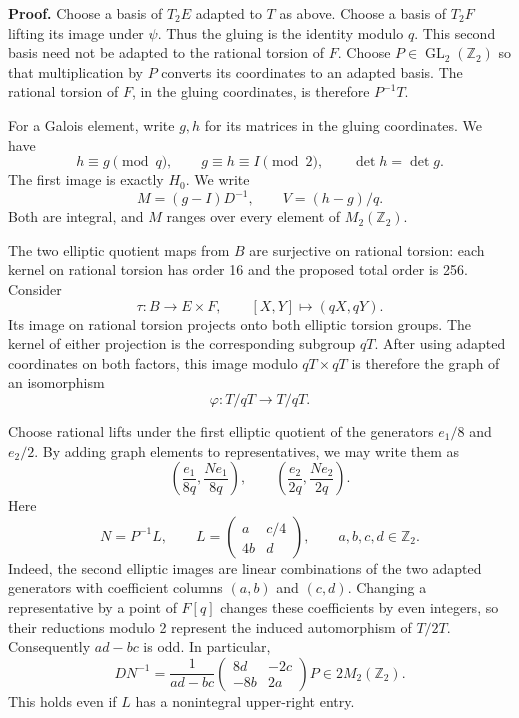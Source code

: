\documentclass[
  11pt,
]{article}
\begin{document}
\textbf{Proof.} Choose a basis of \(T_2E\) adapted to \(T\) as above.
Choose a basis of \(T_2F\) lifting its image under \(\psi\). Thus the
gluing is the identity modulo \(q\). This second basis need not be
adapted to the rational torsion of \(F\). Choose
\(P\in\operatorname{GL}_2(\mathbb Z_2)\) so that multiplication by \(P\)
converts its coordinates to an adapted basis. The rational torsion of
\(F\), in the gluing coordinates, is therefore \(P^{-1}T\).

For a Galois element, write \(g,h\) for its matrices in the gluing
coordinates. We have \[
h\equiv g\pmod q,
\qquad g\equiv h\equiv I\pmod2,
\qquad \det h=\det g.
\] The first image is exactly \(H_0\). We write \[
M=(g-I)D^{-1},\qquad V=(h-g)/q.
\] Both are integral, and \(M\) ranges over every element of
\(M_2(\mathbb Z_2)\).

The two elliptic quotient maps from \(B\) are surjective on rational
torsion: each kernel on rational torsion has order 16 and the proposed
total order is 256. Consider \[
\tau:B\longrightarrow E\times F,
\qquad [X,Y]\longmapsto(qX,qY).
\] Its image on rational torsion projects onto both elliptic torsion
groups. The kernel of either projection is the corresponding subgroup
\(qT\). After using adapted coordinates on both factors, this image
modulo \(qT\times qT\) is therefore the graph of an isomorphism \[
\varphi:T/qT\longrightarrow T/qT.
\]

Choose rational lifts under the first elliptic quotient of the
generators \(e_1/8\) and \(e_2/2\). By adding graph elements to
representatives, we may write them as \[
\left(\frac{e_1}{8q},\frac{Ne_1}{8q}\right),
\qquad
\left(\frac{e_2}{2q},\frac{Ne_2}{2q}\right).
\] Here \[
N=P^{-1}L,
\qquad
L=\begin{pmatrix}a&c/4\\4b&d\end{pmatrix},
\qquad a,b,c,d\in\mathbb Z_2.
\] Indeed, the second elliptic images are linear combinations of the two
adapted generators with coefficient columns \((a,b)\) and \((c,d)\).
Changing a representative by a point of \(F[q]\) changes these
coefficients by even integers, so their reductions modulo 2 represent
the induced automorphism of \(T/2T\). Consequently \(ad-bc\) is odd. In
particular, \[
DN^{-1}
=\frac1{ad-bc}
\begin{pmatrix}8d&-2c\\-8b&2a\end{pmatrix}P
\in 2M_2(\mathbb Z_2).                                  \tag{1}
\] This holds even if \(L\) has a nonintegral upper-right entry.
\end{document}
